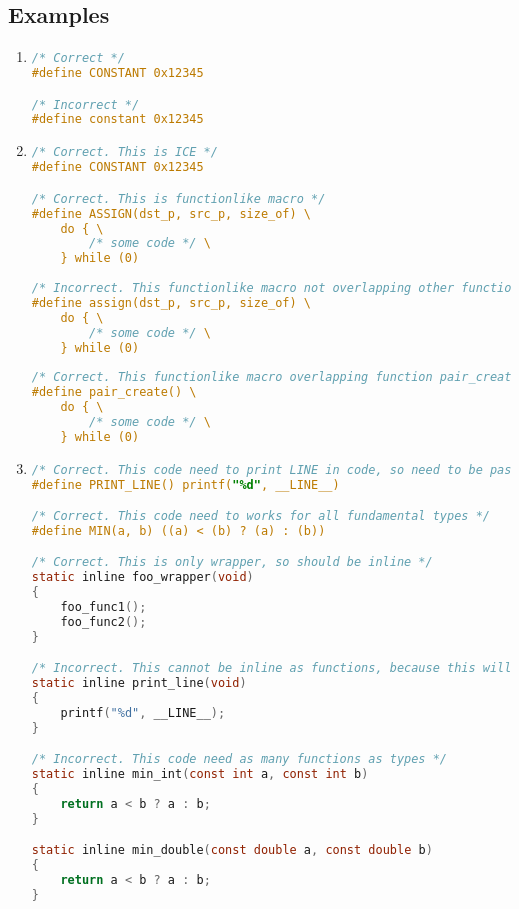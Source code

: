 \subsection{Examples}
\begin{enumerate}
    \item 
\begin{lstlisting}[language=C,style=C99]
/* Correct */
#define CONSTANT 0x12345

/* Incorrect */
#define constant 0x12345
\end{lstlisting}
    
    \item 
\begin{lstlisting}[language=C,style=C99]
/* Correct. This is ICE */
#define CONSTANT 0x12345

/* Correct. This is functionlike macro */
#define ASSIGN(dst_p, src_p, size_of) \
    do { \
        /* some code */ \
    } while (0)
    
/* Incorrect. This functionlike macro not overlapping other function */
#define assign(dst_p, src_p, size_of) \
    do { \
        /* some code */ \
    } while (0)
    
/* Correct. This functionlike macro overlapping function pair_create. */
#define pair_create() \
    do { \
        /* some code */ \
    } while (0)
\end{lstlisting}   
    
    
    \item
\begin{lstlisting}[language=C,style=C99]
/* Correct. This code need to print LINE in code, so need to be pasted into code directly */
#define PRINT_LINE() printf("%d", __LINE__)

/* Correct. This code need to works for all fundamental types */
#define MIN(a, b) ((a) < (b) ? (a) : (b))

/* Correct. This is only wrapper, so should be inline */
static inline foo_wrapper(void)
{
    foo_func1();
    foo_func2();
}

/* Incorrect. This cannot be inline as functions, because this will be print LINE from function code instead of caller code line */
static inline print_line(void)
{
    printf("%d", __LINE__);
}

/* Incorrect. This code need as many functions as types */
static inline min_int(const int a, const int b)
{
    return a < b ? a : b;
}

static inline min_double(const double a, const double b)
{
    return a < b ? a : b;
}


\end{lstlisting}
\end{enumerate}
